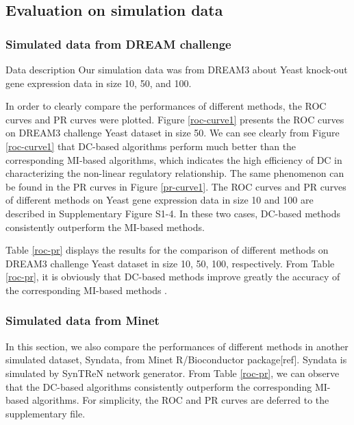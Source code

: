 \documentclass{bioinfo}
\begin{document}
\subsection{Evaluation on simulation data}
\subsubsection{Simulated data from DREAM challenge}
{\color{red} Data description} Our simulation data was from DREAM3
about Yeast knock-out gene expression data in size 10, 50, and 100.

In order to clearly compare the performances of different methods, the ROC curves and PR curves were plotted.  Figure \ref{roc-curve1} presents the ROC curves on DREAM3 challenge Yeast dataset in size 50. We can see clearly from Figure \ref{roc-curve1} that DC-based algorithms perform much better than the corresponding MI-based algorithms, which indicates the high efficiency of DC in characterizing the non-linear regulatory relationship.
The same phenomenon can be found in the PR curves in Figure \ref{pr-curve1}. The ROC curves and PR curves of different methods on Yeast gene expression data in size 10 and 100 are described in Supplementary Figure S1-4. In these two cases, DC-based methods consistently outperform  the MI-based methods.

Table \ref{roc-pr} displays the results for the comparison of different methods on DREAM3 challenge Yeast dataset in size 10, 50, 100, respectively. From Table \ref{roc-pr}, it is obviously that DC-based methods improve greatly the accuracy of the corresponding MI-based methods .

\subsubsection{Simulated data from Minet} In this section, we also compare the performances of different methods in another simulated dataset, Syndata, from Minet R/Bioconductor package[ref]. Syndata is simulated by SynTReN network generator. From Table \ref{roc-pr}, we can observe that the DC-based algorithms  consistently outperform the corresponding MI-based algorithms.  For simplicity, the ROC and PR curves are deferred to the supplementary file.
\end{document}
